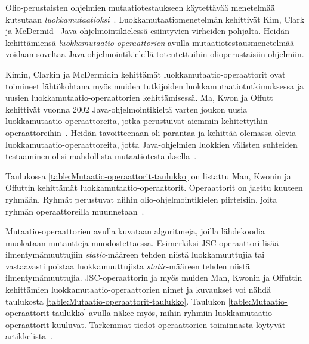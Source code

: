 \documentclass[finnish, grading]{tktltiki2}
\theoremstyle{definition}
\theoremstyle{remark}
\begin{document}
Olio-perustaisten ohjelmien mutaatiotestaukseen käytettävää menetelmää kutsutaan \textit{luokkamutaatioksi}~\cite{Kim:Clark:McDermid:2000}. Luokkamutaatiomenetelmän kehittivät Kim, Clark ja McDermid~\cite{Kim:Clark:McDermid:2000} Java-ohjelmointikielessä esiintyvien virheiden pohjalta. Heidän kehittämiensä \textit{luokkamutaatio-operaattorien} avulla mutaatiotestausmenetelmää voidaan soveltaa Java-ohjelmointikielellä toteutettuihin olioperustaisiin ohjelmiin.

Kimin, Clarkin ja McDermidin kehittämät luokkamutaatio-operaattorit ovat toimineet lähtökohtana myös muiden tutkijoiden luokkamutaatiotutkimuksessa ja uusien luokkamutaatio-operaattorien kehittämisessä. Ma, Kwon ja Offutt kehittivät vuonna 2002 Java-ohjelmointikieltä varten joukon uusia luokkamutaatio-operaattoreita, jotka perustuivat aiemmin kehitettyihin operaattoreihin~\cite[s. 352]{Ma:Kwon:Offutt:2002}. Heidän tavoitteenaan oli parantaa ja kehittää olemassa olevia luokkamutaatio-operaattoreita, jotta Java-ohjelmien luokkien välisten suhteiden testaaminen olisi mahdollista mutaatiotestauksella~\cite[s. 362]{Ma:Kwon:Offutt:2002}.

Taulukossa \ref{table:Mutaatio-operaattorit-taulukko} on listattu Man, Kwonin ja Offuttin kehittämät luok\-ka\-mu\-taa\-ti\-o-o\-pe\-raat\-to\-rit. Operaattorit on jaettu kuuteen ryhmään. Ryhmät perustuvat niihin olio-ohjelmointikielen piirteisiin, joita ryhmän operaattoreilla muunnetaan~\cite[s. 355]{Ma:Kwon:Offutt:2002}.

Mutaatio-operaattorien avulla kuvataan algoritmeja, joilla lähdekoodia muokataan mutantteja muodostettaessa. Esimerkiksi JSC-operaattori lisää ilmentymämuuttujiin \textit{static}-määreen tehden niistä luokkamuuttujia tai vastaavasti poistaa luokkamuuttujista \textit{static}-määreen tehden niistä ilmentymämuuttujia. JSC-operaattorin ja myös muiden Man, Kwonin ja Offuttin kehittämien luokkamutaatio-operaattorien nimet ja kuvaukset voi nähdä taulukosta \ref{table:Mutaatio-operaattorit-taulukko}. Taulukon \ref{table:Mutaatio-operaattorit-taulukko} avulla näkee myös, mihin ryhmiin luokkamutaatio-operaattorit kuuluvat. Tarkemmat tiedot operaattorien toiminnasta löytyvät artikkelista~\cite{Ma:Kwon:Offutt:2002}. 
\end{document}
